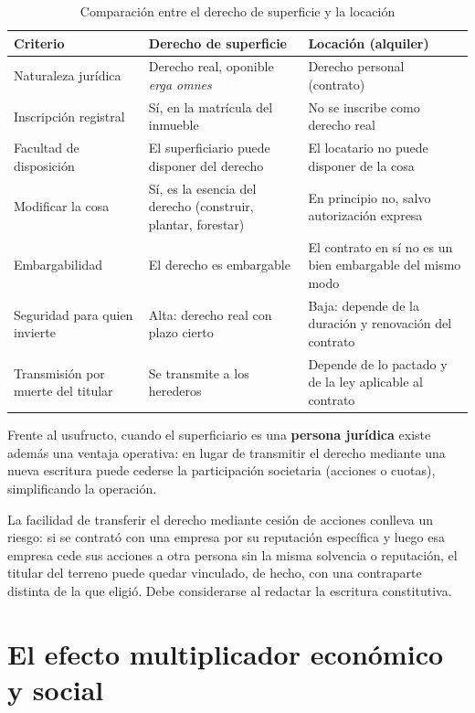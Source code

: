 \documentclass[12pt,oneside]{book}
\begin{document}
\begin{table}[H]
\centering
\caption{Comparación entre el derecho de superficie y la locación}
\renewcommand{\arraystretch}{1.2}
\begin{tabularx}{\textwidth}{>{\raggedright\arraybackslash}p{}>{\raggedright\arraybackslash}X>{\raggedright\arraybackslash}X}
\toprule
\textbf{Criterio} & \textbf{Derecho de superficie} & \textbf{Locación (alquiler)} \\
\midrule
Naturaleza jurídica & Derecho real, oponible \emph{erga omnes} & Derecho personal (contrato) \\
Inscripción registral & Sí, en la matrícula del inmueble & No se inscribe como derecho real \\
Facultad de disposición & El superficiario puede disponer del derecho & El locatario no puede disponer de la cosa \\
Modificar la cosa & Sí, es la esencia del derecho (construir, plantar, forestar) & En principio no, salvo autorización expresa \\
Embargabilidad & El derecho es embargable & El contrato en sí no es un bien embargable del mismo modo \\
Seguridad para quien invierte & Alta: derecho real con plazo cierto & Baja: depende de la duración y renovación del contrato \\
Transmisión por muerte del titular & Se transmite a los herederos & Depende de lo pactado y de la ley aplicable al contrato \\
\bottomrule
\end{tabularx}
\end{table}

Frente al usufructo, cuando el superficiario es una \textbf{persona jurídica} existe además una ventaja operativa: en lugar de transmitir el derecho mediante una nueva escritura puede cederse la participación societaria (acciones o cuotas), simplificando la operación.

\begin{warning}
La facilidad de transferir el derecho mediante cesión de acciones conlleva un riesgo: si se contrató con una empresa por su reputación específica y luego esa empresa cede sus acciones a otra persona sin la misma solvencia o reputación, el titular del terreno puede quedar vinculado, de hecho, con una contraparte distinta de la que eligió. Debe considerarse al redactar la escritura constitutiva.
\end{warning}

\section{El efecto multiplicador económico y social}
\end{document}
